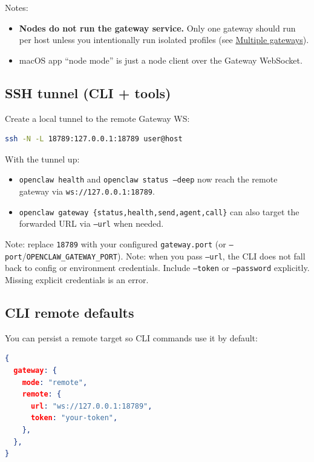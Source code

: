Notes:

\begin{itemize}
  \item \textbf{Nodes do not run the gateway service.} Only one gateway should run per host unless you intentionally run isolated profiles (see \href{/gateway/multiple-gateways}{Multiple gateways}).
  \item macOS app “node mode” is just a node client over the Gateway WebSocket.
\end{itemize}


\subsection{SSH tunnel (CLI + tools)}


Create a local tunnel to the remote Gateway WS:

\begin{lstlisting}[language=bash]
ssh -N -L 18789:127.0.0.1:18789 user@host
\end{lstlisting}


With the tunnel up:

\begin{itemize}
  \item \texttt{openclaw health} and \texttt{openclaw status --deep} now reach the remote gateway via \texttt{ws://127.0.0.1:18789}.
  \item \texttt{openclaw gateway \{status,health,send,agent,call\}} can also target the forwarded URL via \texttt{--url} when needed.
\end{itemize}


Note: replace \texttt{18789} with your configured \texttt{gateway.port} (or \texttt{--port}/\texttt{OPENCLAW\_GATEWAY\_PORT}).
Note: when you pass \texttt{--url}, the CLI does not fall back to config or environment credentials.
Include \texttt{--token} or \texttt{--password} explicitly. Missing explicit credentials is an error.

\subsection{CLI remote defaults}


You can persist a remote target so CLI commands use it by default:

\begin{lstlisting}[language=json]
{
  gateway: {
    mode: "remote",
    remote: {
      url: "ws://127.0.0.1:18789",
      token: "your-token",
    },
  },
}
\end{lstlisting}


